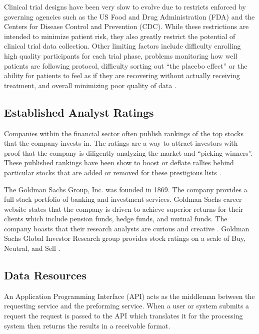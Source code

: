 \documentclass[sigconf]{acmart}
\begin{document}
Clinical trial designs have been very slow to evolve due to restricts enforced by governing agencies such as the US Food and Drug Administration (FDA) and the Centers for Disease Control and Prevention (CDC). While these restrictions are intended to minimize patient risk, they also greatly restrict the potential of clinical trial data collection. Other limiting factors include  difficulty enrolling high quality participants for each trial phase, problems monitoring how well patients are following protocol, difficulty sorting out ``the placebo effect'' or the ability for patients to feel as if they are recovering without actually receiving treatment, and overall minimizing poor quality of data \cite{Friedman}. 

\subsection{Established Analyst Ratings}
Companies within the financial sector often publish rankings of the top stocks that the company invests in. The ratings are a way to attract investors with proof that the company is diligently analyzing the market and ``picking winners''. These published rankings have been show to boost or deflate rallies behind particular stocks that are added or removed for these prestigious lists \cite{www-seekAnalyst}. 

The Goldman Sachs Group, Inc. was founded in 1869. The company provides a full stack portfolio of banking and investment services. Goldman Sachs career website states that the company is driven to achieve superior returns for their clients which include pension funds, hedge funds, and mutual funds. The company boasts that their research analysts are curious and creative \cite{www-gldmanGlance}. Goldman Sachs Global Investor Research group provides stock ratings on a scale of Buy, Neutral, and Sell \cite{www-goldmanTicker}. 





\subsection{Data Resources}
An Application Programming Interface (API) acts as the middleman between the requesting service and the preforming service. When a user or system submits a request the request is passed to the API which translates it for the processing system then returns the results in a receivable format. 
\end{document}
